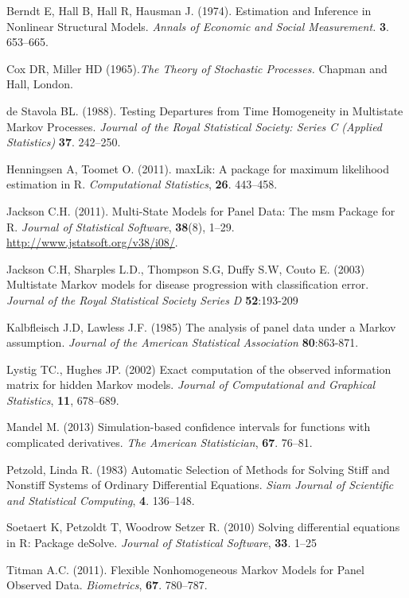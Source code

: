 \documentclass{article}
\numberwithin{equation}{section}
\begin{document}
\begin{thebibliography}{unsrt}

 Berndt E, Hall B, Hall R, Hausman J. (1974). Estimation and Inference in Nonlinear Structural Models. {\it Annals of Economic and Social Measurement.} {\bf 3}. 653--665.

 Cox DR, Miller HD (1965).{\it The Theory of Stochastic Processes.} Chapman and Hall, London.

 de Stavola BL. (1988). Testing Departures from Time Homogeneity in Multistate Markov Processes. {\it Journal of the Royal Statistical Society: Series C (Applied Statistics)} {\bf 37}. 242--250.

 Henningsen A, Toomet O. (2011). maxLik: A package for maximum likelihood estimation in R.  {\it Computational Statistics}, {\bf 26}. 443--458.


 Jackson C.H. (2011). Multi-State Models for Panel Data: The msm Package for R. {\it Journal of Statistical Software}, {\bf 38}(8), 1--29. \url{http://www.jstatsoft.org/v38/i08/}.

 Jackson C.H, Sharples L.D., Thompson S.G, Duffy S.W, Couto E. (2003) Multistate Markov models for disease progression with classification error. {\it Journal of the Royal Statistical Society Series D} {\bf 52}:193-209

 Kalbfleisch J.D, Lawless J.F. (1985) The analysis of panel data under a Markov assumption. {\it Journal of the American Statistical Association} {\bf 80}:863-871.

 Lystig TC., Hughes JP. (2002) Exact computation of the observed information matrix for hidden Markov models. {\it Journal of Computational and Graphical Statistics}, {\bf 11}, 678--689.

 Mandel M. (2013) Simulation-based confidence intervals for functions with complicated derivatives. {\it The American Statistician}, {\bf 67}. 76--81.

 Petzold, Linda R. (1983) Automatic Selection of Methods for Solving Stiff and Nonstiff Systems of Ordinary Differential Equations. {\it Siam Journal of Scientific and Statistical Computing}, {\bf 4}. 136--148.

 Soetaert K, Petzoldt T, Woodrow Setzer R. (2010) Solving differential equations in R: Package deSolve. {\it Journal of Statistical Software}, {\bf 33}. 1--25

 Titman A.C. (2011). Flexible Nonhomogeneous Markov Models for Panel Observed Data. {\it Biometrics}, {\bf 67}. 780--787.

\end{thebibliography}
\end{document}
